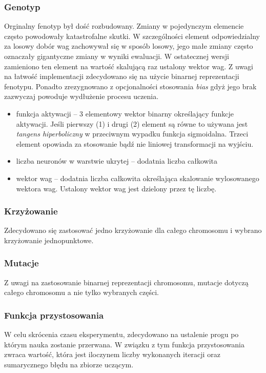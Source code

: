 \documentclass{llncs}
\begin{document}
\subsubsection{Genotyp}
Orginalny fenotyp był dość rozbudowany. Zmiany w pojedynczym elemencie często powodowały katastrofalne skutki.
W szczególności element odpowiedzialny za losowy dobór wag zachowywał się w sposób losowy, jego małe zmiany
często oznaczały gigantyczne zmiany w wyniki ewaluacji. W ostatecznej wersji zamieniono ten element na 
wartość skalującą raz ustalony wektor wag.
Z uwagi na łatwość implementacji zdecydowano się na użycie binarnej reprezentacji fenotypu. 
Ponadto zrezygnowano z opcjonalności stosowania \emph{bias} gdyż jego brak zazwyczaj
powoduje wydłużenie procesu uczenia.
\begin{itemize}
	\item funkcja aktywacji -- 3 elementowy wektor binarny określający funkcje aktywacji. Jeśli pierwszy (1) i 
	drugi (2) element są równe to używana jest \emph{tangens hiperboliczny} w przeciwnym wypadku funkcja sigmoidalna.
	Trzeci element opowiada za stosowanie bądź nie liniowej transformacji na wyjściu.
	\item liczba neuronów w warstwie ukrytej -- dodatnia liczba całkowita
	\item wektor wag -- dodatnia liczba całkowita określająca skalowanie wylosowanego wektora wag.
	Ustalony wektor wag jest dzielony przez tę liczbę.
\end{itemize}

\subsubsection{Krzyżowanie}
Zdecydowano się zastosować jedno krzyżowanie dla całego chromosomu i wybrano krzyżowanie
jednopunktowe.

\subsubsection{Mutacje}
Z uwagi na zastosowanie binarnej reprezentacji chromosomu, mutacje dotyczą całego chromosomu 
a nie tylko wybranych części.

\subsubsection{Funkcja przystosowania}
W celu skrócenia czasu eksperymentu, zdecydowano na ustalenie progu po którym nauka zostanie przerwana.
W związku z tym funkcja przystosowania zwraca wartość, która jest iloczynem
liczby wykonanych iteracji oraz sumarycznego błędu na zbiorze uczącym.
\end{document}
